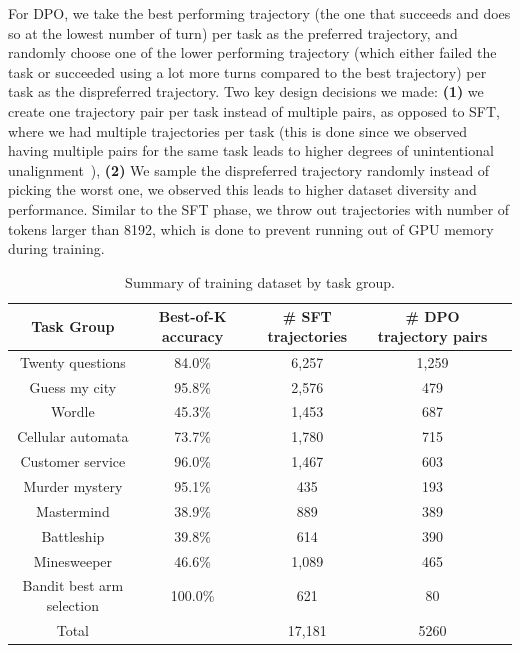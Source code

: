 For DPO, we take the best performing trajectory (the one that succeeds and does so at the lowest number of turn) per task as the preferred trajectory, and randomly choose one of the lower performing trajectory (which either failed the task or succeeded using a lot more turns compared to the best trajectory) per task as the dispreferred trajectory. Two key design decisions we made: \textbf{(1)} we create one trajectory pair per task instead of multiple pairs, as opposed to SFT, where we had multiple trajectories per task (this is done since we observed having multiple pairs for the same task leads to higher degrees of unintentional unalignment~\citep{razin2024unintentionalunalignmentlikelihooddisplacement}), \textbf{(2)} We sample the dispreferred trajectory randomly instead of picking the worst one, we observed this leads to higher dataset diversity and performance. Similar to the SFT phase, we throw out trajectories with number of tokens larger than 8192, which is done to prevent running out of GPU memory during training.

\begin{table}[h]
    \caption{Summary of training dataset by task group. }
    \label{tab:train_dataset_summary}
    \vspace{0.3cm}
    \centering
        \begin{tabular}{c|c c c c}
        \toprule
            Task Group & Best-of-K accuracy & \# SFT trajectories & \# DPO trajectory pairs \\
            \midrule
            Twenty questions & 84.0\% & 6,257 & 1,259 \\
             Guess my city & 95.8\% & 2,576 & 479 \\
             Wordle & 45.3\% & 1,453 & 687 \\
             Cellular automata & 73.7\% & 1,780 & 715 \\
             Customer service & 96.0\% & 1,467 & 603 \\
             Murder mystery & 95.1\% & 435 & 193 \\
             Mastermind & 38.9\% & 889 & 389  \\
             Battleship & 39.8\% & 614 & 390 \\
             Minesweeper & 46.6\% & 1,089 & 465  \\
             Bandit best arm selection & 100.0\% & 621 & 80 \\
            \midrule
            Total & & 17,181 & 5260 \\
            \bottomrule
        \end{tabular}
    \vspace{-0.3cm}
\end{table}

